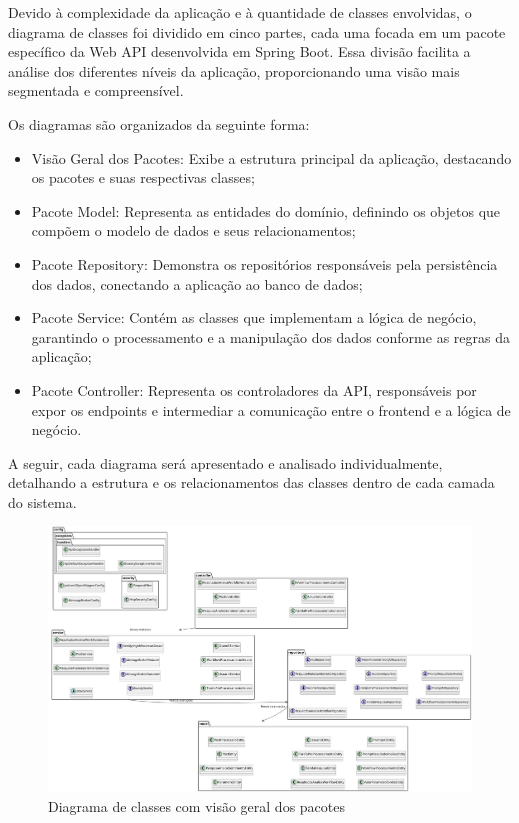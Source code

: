 \documentclass[
	12pt,				%
	oneside,			%
	a4paper,			%
	english,			%
	french,				%
	spanish,			%
	brazil				%
	]{abntex2}
\begin{document}
Devido à complexidade da aplicação e à quantidade de classes envolvidas,
o diagrama de classes foi dividido em cinco partes, cada uma focada em
um pacote específico da Web API desenvolvida em Spring Boot. Essa
divisão facilita a análise dos diferentes níveis da aplicação,
proporcionando uma visão mais segmentada e compreensível.

Os diagramas são organizados da seguinte forma:

\begin{itemize}
\tightlist
\item
  Visão Geral dos Pacotes: Exibe a estrutura principal da aplicação,
  destacando os pacotes e suas respectivas classes;
\item
  Pacote Model: Representa as entidades do domínio, definindo os objetos
  que compõem o modelo de dados e seus relacionamentos;
\item
  Pacote Repository: Demonstra os repositórios responsáveis pela
  persistência dos dados, conectando a aplicação ao banco de dados;
\item
  Pacote Service: Contém as classes que implementam a lógica de negócio,
  garantindo o processamento e a manipulação dos dados conforme as
  regras da aplicação;
\item
  Pacote Controller: Representa os controladores da API, responsáveis
  por expor os endpoints e intermediar a comunicação entre o frontend e
  a lógica de negócio.
\end{itemize}

A seguir, cada diagrama será apresentado e analisado individualmente,
detalhando a estrutura e os relacionamentos das classes dentro de cada
camada do sistema.

\begin{figure}[htbp]
\hypertarget{diagrama_classe_geral}{%
\caption{Diagrama de classes com visão geral dos pacotes}\label{diagrama_classe_geral}
\begin{center}
\includegraphics[scale=0.2]{imagens/sentilytics/diagramas/classes/diagrama-classe-visao-geral-pacotes.png}
\end{center}
}
\end{figure}
\end{document}
